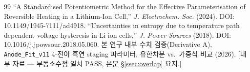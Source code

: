\documentclass[11pt,a4paper]{article}
\begin{document}
\begin{thebibliography}{99}
 ``A Standardised Potentiometric Method for the Effective Parameterisation of Reversible Heating in a Lithium-Ion Cell,'' \emph{J. Electrochem. Soc.} (2024). DOI: 10.1149/1945-7111/ad4918.
 ``Uncertainties in entropy due to temperature path dependent voltage hysteresis in Li-ion cells,'' \emph{J. Power Sources} (2018). DOI: 10.1016/j.jpowsour.2018.05.060.
 본 연구 내부 수치 검증(Derivative A), \texttt{Anode\_Fit\_v11} 4-전이 흑연 staging 파라미터, 유한차분 vs.\ 가중식 비교 (2026). [내부 자료 — 부동소수점 일치 PASS, 본문 \S\ref{ssec:overlap} 요지.]
\end{thebibliography}
\end{document}
